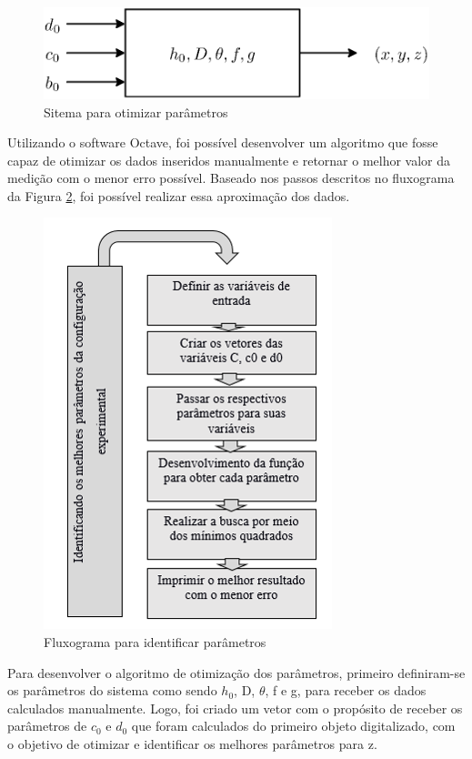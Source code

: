 \documentclass[a4paper, 12pt]{article}
\begin{document}
\begin{figure}[h!]
	\centering
		\includegraphics[width=.55\linewidth]{sitema_otimizacao.eps}
	\caption{Sitema para otimizar parâmetros}
	\label{sitema_otimizacao}
\end{figure}

Utilizando o software Octave, foi possível desenvolver um algoritmo que fosse capaz de otimizar os dados inseridos manualmente e retornar o melhor valor da medição com o menor erro possível. Baseado nos passos descritos no fluxograma da Figura \ref{identificar parametros}, foi possível realizar essa aproximação dos dados.


\begin{figure}[h!]
	\centering
		\includegraphics[width=.55\linewidth]{fluxograma_identificar_parametros.png}
	\caption{Fluxograma para identificar parâmetros}
	\label{identificar parametros}
\end{figure}

Para desenvolver o algoritmo de otimização dos parâmetros, primeiro definiram-se os parâmetros do sistema como sendo $h_0$, D, $\theta$, f e g, para receber os dados calculados manualmente. Logo, foi criado um vetor com o propósito de receber os parâmetros de $c_0$ e $d_0$ que foram calculados do primeiro objeto digitalizado, com o objetivo de otimizar e identificar os melhores parâmetros para z.
\end{document}
